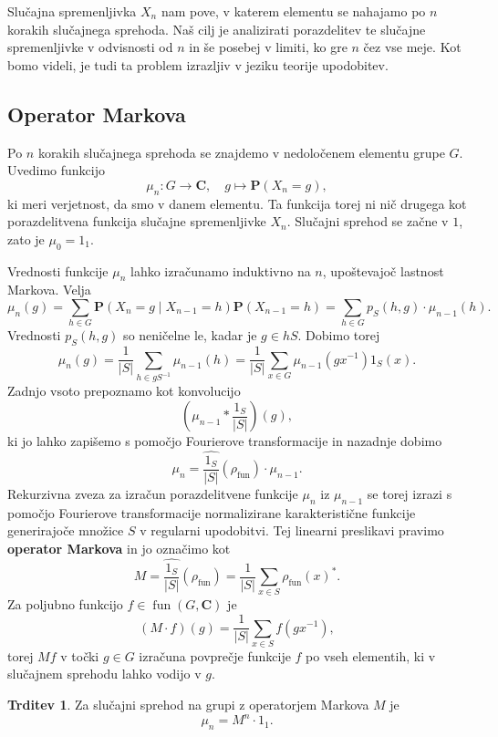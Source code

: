 \documentclass[11pt]{book}
\def\CC{\mathbf{C}}
\def\PP{\mathbf{P}}
\DeclareMathOperator\fun{fun}
\def\definicija{\color{rdeca}\bf}
\theoremstyle{definition}
\theoremstyle{zgled}
\theoremstyle{zgledbrezstevilke}
\theoremstyle{odprtproblem}
\theoremstyle{domacanaloga}
\theoremstyle{izrek}
\newtheorem{trditev}[theorem]{Trditev}
\begin{document}
Slučajna spremenljivka $X_n$ nam pove, v katerem elementu se nahajamo po $n$ korakih slučajnega sprehoda. Naš cilj je analizirati porazdelitev te slučajne spremenljivke v odvisnosti od $n$ in še posebej v limiti, ko gre $n$ čez vse meje. Kot bomo videli, je tudi ta problem izrazljiv v jeziku teorije upodobitev.

\subsection{Operator Markova}

Po $n$ korakih slučajnega sprehoda se znajdemo v nedoločenem elementu grupe $G$. Uvedimo funkcijo
\[
    \mu_n \colon G \to \CC, \quad
    g \mapsto \PP(X_n = g),
\]
ki meri verjetnost, da smo v danem elementu. Ta funkcija torej ni nič drugega kot porazdelitvena funkcija slučajne spremenljivke $X_n$. Slučajni sprehod se začne v $1$, zato je $\mu_0 = 1_1$.

Vrednosti funkcije $\mu_n$ lahko izračunamo induktivno na $n$, upoštevajoč lastnost Markova. Velja
\[
    \mu_n(g) 
    = \sum_{h \in G} \PP(X_n = g \mid X_{n-1} = h) \PP(X_{n-1} = h)
    = \sum_{h \in G} p_{S}(h,g) \cdot \mu_{n-1}(h).
\]
Vrednosti $p_{S}(h,g)$ so neničelne le, kadar je $g \in h S$. Dobimo torej
\[
    \mu_n(g)
    = \frac{1}{|S|} \sum_{h \in g S^{-1}} \mu_{n-1}(h)
    = \frac{1}{|S|} \sum_{x \in G} \mu_{n-1}(gx^{-1}) 1_{S}(x).
\]
Zadnjo vsoto prepoznamo kot konvolucijo
\[
    \left( \mu_{n-1} * \frac{1_{S}}{|S|} \right) (g),
\]
ki jo lahko zapišemo s pomočjo Fourierove transformacije in nazadnje dobimo
\[
    \mu_n = \widehat{\frac{1_{S}}{|S|} }(\rho_{\fun}) \cdot \mu_{n-1}.
\]
Rekurzivna zveza za izračun porazdelitvene funkcije $\mu_n$ iz $\mu_{n-1}$ se torej izrazi s pomočjo Fourierove transformacije normalizirane karakteristične funkcije generirajoče množice $S$ v regularni upodobitvi. Tej linearni preslikavi pravimo {\definicija operator Markova} in jo označimo kot
\[
    M = \widehat{\frac{1_{S}}{|S|} }(\rho_{\fun}) = \frac{1}{|S|} \sum_{x \in S} \rho_{\fun}(x)^*.
\]
Za poljubno funkcijo $f \in \fun(G,\CC)$ je 
\[
    (M \cdot f)(g) = \frac{1}{|S|} \sum_{x \in S} f(g x^{-1}),
\]
torej $Mf$ v točki $g \in G$ izračuna povprečje funkcije $f$ po vseh elementih, ki v slučajnem sprehodu lahko vodijo v $g$.

\begin{trditev}
Za slučajni sprehod na grupi z operatorjem Markova $M$ je
\[
    \mu_n = M^n \cdot 1_1.
\]
\end{trditev}
\end{document}
